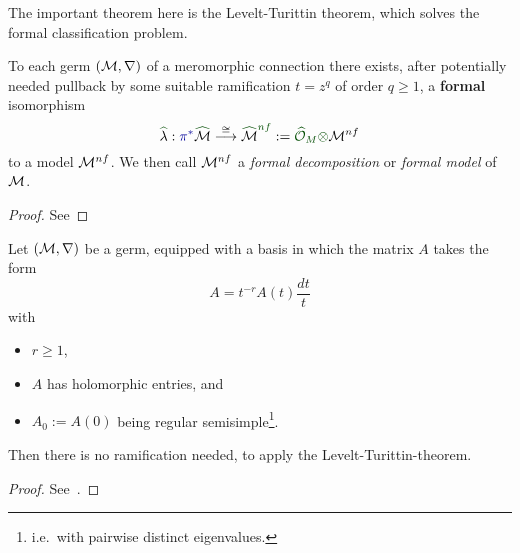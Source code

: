 The important theorem here is the Levelt-Turittin theorem, which solves the
formal classification problem.
\begin{thm}
  To each germ $(\mathcal{M},\nabla)$ of a meromorphic connection there exists, after
  potentially needed \textcolor{blue!60!black}{pullback by some suitable
  ramification $t=z^q$ of order $q\geq1$}, a
  \textcolor{green!30!black}{\textbf{formal}} isomorphism
  \[
    \textcolor{green!30!black}{\hat{\textcolor{black}{\lambda}}}:
    \textcolor{blue!60!black}{\pi^{*}}
    \textcolor{green!30!black}{\hat{\textcolor{black}{\cM}}}
    \overset{\cong}\longrightarrow
    \textcolor{green!30!black}{\hat{\textcolor{black}{\cM}}^{nf}}
    :=\textcolor{green!30!black}{\hat\cO_M\otimes}\cM^{nf}
  \]
  to a model $\mathcal{M}^{nf}$.
  We then call $\mathcal{M}^{nf}$ a \emph{formal decomposition} or \emph{formal
  model} of $\mathcal{M}$.
\end{thm}
\begin{proof}
  See \TODO{}
\end{proof}
\begin{prop}
  Let $(\mathcal{M},\nabla)$ be a germ, equipped with a basis in which the matrix $A$
  takes the form
  \[
    A=t^{-r}A(t)\frac{dt}{t}
  \]
  with
  \begin{itemize}
    \item $r\geq1$,
    \item $A$ has holomorphic entries, and
    \item $A_0:=A(0)$ being regular semisimple\footnote{i.e.\ with
      pairwise distinct eigenvalues.}.
  \end{itemize}
  Then there is no ramification needed, to apply the Levelt-Turittin-theorem.
  \begin{comment}
    Further, all the summands $\cR_\phi$ have rank one, which is not the case
    in general.
  \end{comment}
\end{prop}
\begin{proof}
  See~\cite[Thm.II.5.7]{sabbah2007isomonodromic}.
\end{proof}


